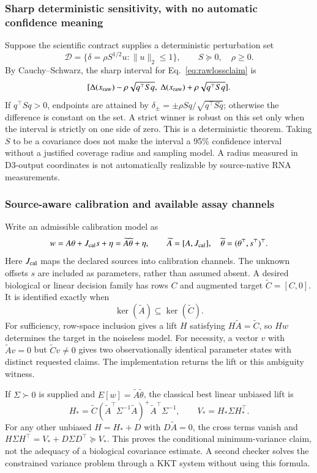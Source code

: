 \documentclass[11pt]{article}
\begin{document}
\subsubsection{Sharp deterministic sensitivity, with no automatic confidence meaning}
Suppose the scientific contract supplies a deterministic perturbation set
\[
\mathcal D=\{\delta=\rho S^{1/2}u:\|u\|_2\leq1\},\qquad S\succeq0,\quad\rho\ge0.
\]
By Cauchy--Schwarz, the sharp interval for Eq.~\ref{eq:rawlossclaim} is
\[
[\Delta(x_{\rm raw})-\rho\sqrt{q^\top Sq},\ \Delta(x_{\rm raw})+\rho\sqrt{q^\top Sq}].
\]
If $q^\top Sq>0$, endpoints are attained by $\delta_\pm=\pm\rho Sq/\sqrt{q^\top Sq}$; otherwise the difference is constant on the set. A strict winner is robust on this set only when the interval is strictly on one side of zero. This is a deterministic theorem. Taking $S$ to be a covariance does not make the interval a 95\% confidence interval without a justified coverage radius and sampling model. A radius measured in D3-output coordinates is not automatically realizable by source-native RNA measurements.

\subsubsection{Source-aware calibration and available assay channels}
Write an admissible calibration model as
\[
w=A\theta+J_{\rm cal}s+\eta=\widetilde A\widetilde\theta+\eta,
\qquad\widetilde A=[A,J_{\rm cal}],\quad\widetilde\theta=(\theta^\top,s^\top)^\top.
\]
Here $J_{\rm cal}$ maps the declared sources into calibration channels. The unknown offsets $s$ are included as parameters, rather than assumed absent. A desired biological or linear decision family has rows $C$ and augmented target $\widetilde C=[C,0]$. It is identified exactly when
\[
\ker(\widetilde A)\subseteq\ker(\widetilde C).
\label{eq:sourceclaiminformation}
\]
For sufficiency, row-space inclusion gives a lift $H$ satisfying $H\widetilde A=\widetilde C$, so $Hw$ determines the target in the noiseless model. For necessity, a vector $v$ with $\widetilde Av=0$ but $\widetilde Cv\ne0$ gives two observationally identical parameter states with distinct requested claims. The implementation returns the lift or this ambiguity witness.

If $\Sigma\succ0$ is supplied and $E[w]=\widetilde A\widetilde\theta$, the classical best linear unbiased lift is
\[
H_*=\widetilde C(\widetilde A^\top\Sigma^{-1}\widetilde A)^+
\widetilde A^\top\Sigma^{-1},\qquad
V_*=H_*\Sigma H_*^\top.
\]
For any other unbiased $H=H_*+D$ with $D\widetilde A=0$, the cross terms vanish and
$H\Sigma H^\top=V_*+D\Sigma D^\top\succeq V_*$. This proves the conditional minimum-variance claim, not the adequacy of a biological covariance estimate. A second checker solves the constrained variance problem through a KKT system without using this formula.
\end{document}
